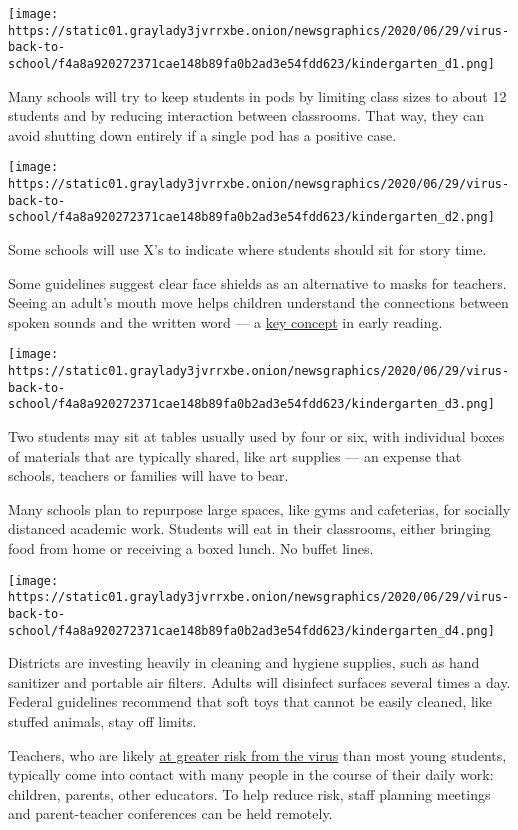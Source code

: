 \texttt{[image: https://static01.graylady3jvrrxbe.onion/newsgraphics/2020/06/29/virus-back-to-school/f4a8a920272371cae148b89fa0b2ad3e54fdd623/kindergarten\_d1.png]}

Many schools will try to keep students in pods by limiting class sizes
to about 12 students and by reducing interaction between classrooms.
That way, they can avoid shutting down entirely if a single pod has a
positive case.

\texttt{[image: https://static01.graylady3jvrrxbe.onion/newsgraphics/2020/06/29/virus-back-to-school/f4a8a920272371cae148b89fa0b2ad3e54fdd623/kindergarten\_d2.png]}

Some schools will use X's to indicate where students should sit for
story time.

Some guidelines suggest clear face shields as an alternative to masks
for teachers. Seeing an adult's mouth move helps children understand the
connections between spoken sounds and the written word --- a
\href{https://www.nytimes3xbfgragh.onion/2020/02/15/us/reading-phonics.html}{key
concept} in early reading.

\texttt{[image: https://static01.graylady3jvrrxbe.onion/newsgraphics/2020/06/29/virus-back-to-school/f4a8a920272371cae148b89fa0b2ad3e54fdd623/kindergarten\_d3.png]}

Two students may sit at tables usually used by four or six, with
individual boxes of materials that are typically shared, like art
supplies --- an expense that schools, teachers or families will have to
bear.

Many schools plan to repurpose large spaces, like gyms and cafeterias,
for socially distanced academic work. Students will eat in their
classrooms, either bringing food from home or receiving a boxed lunch.
No buffet lines.

\texttt{[image: https://static01.graylady3jvrrxbe.onion/newsgraphics/2020/06/29/virus-back-to-school/f4a8a920272371cae148b89fa0b2ad3e54fdd623/kindergarten\_d4.png]}

Districts are investing heavily in cleaning and hygiene supplies, such
as hand sanitizer and portable air filters. Adults will disinfect
surfaces several times a day. Federal guidelines recommend that soft
toys that cannot be easily cleaned, like stuffed animals, stay off
limits.

Teachers, who are likely
\href{https://www.nytimes3xbfgragh.onion/2020/07/15/health/coronavirus-schools-reopening.html}{at
greater risk from the virus} than most young students, typically come
into contact with many people in the course of their daily work:
children, parents, other educators. To help reduce risk, staff planning
meetings and parent-teacher conferences can be held remotely.

